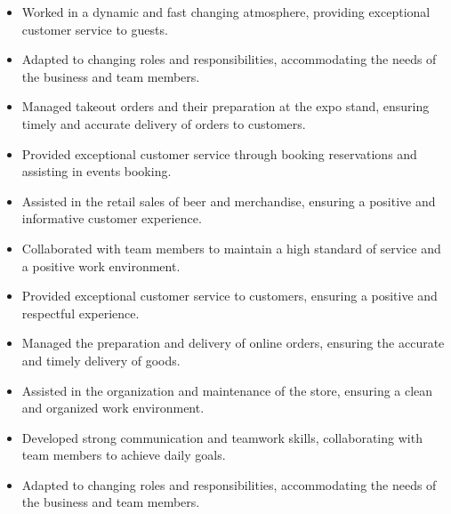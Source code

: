 \documentclass[9pt,a4paper,ragged2e,withhyper]{altacv}
\begin{document}
\begin{itemize}
	\item Worked in a dynamic and fast changing atmosphere, providing exceptional customer service to guests.
	\item Adapted to changing roles and responsibilities, accommodating the needs of the business and team members.
	\item Managed takeout orders and their preparation at the expo stand, ensuring timely and accurate delivery of orders to customers.
	\item Provided exceptional customer service through booking reservations and assisting in events booking.
	\item Assisted in the retail sales of beer and merchandise, ensuring a positive and informative customer experience.
	\item Collaborated with team members to maintain a high standard of service and a positive work environment.
\end{itemize}
\divider

\begin{itemize}
	\item Provided exceptional customer service to customers, ensuring a positive and respectful experience.
	\item Managed the preparation and delivery of online orders, ensuring the accurate and timely delivery of goods.
	\item Assisted in the organization and maintenance of the store, ensuring a clean and organized work environment.
	\item Developed strong communication and teamwork skills, collaborating with team members to achieve daily goals.
	\item Adapted to changing roles and responsibilities, accommodating the needs of the business and team members.
\end{itemize}
\end{document}

